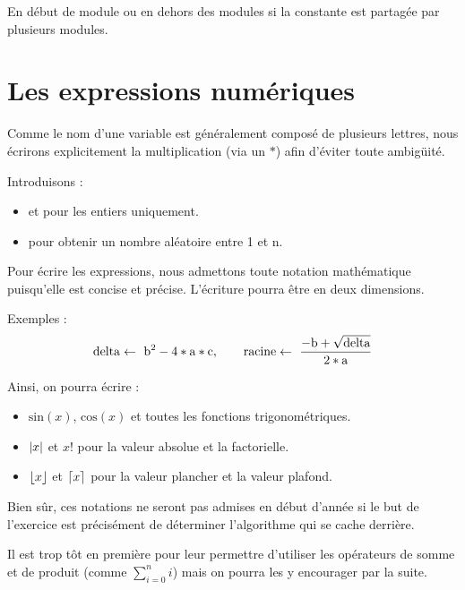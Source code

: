 	En début de module ou en dehors des modules si la constante
	est partagée par plusieurs modules.

\section{Les expressions numériques}

	Comme le nom d'une variable est généralement composé de plusieurs lettres,
	nous écrirons explicitement la multiplication (via un $*$)
	afin d'éviter toute ambigüité.

	Introduisons :

	\begin{itemize}
	\item
		 et  pour les entiers uniquement. 
	\item 
		 pour obtenir un nombre aléatoire entre 1 et n.
	\end{itemize}

	Pour écrire les expressions,
	nous admettons toute notation mathématique
	puisqu'elle est concise et précise.
	L'écriture pourra être en deux dimensions.
	
	Exemples : 
	\begin{equation*}
		\mathrm{delta} \gets\  \mathrm{b}^{2} - 4 * \mathrm{a} * \mathrm{c}
		,\qquad
		\mathrm{racine} \gets\  \frac{-\mathrm{b} + \sqrt{\mathrm{delta}}}{2*\mathrm{a}}
	\end{equation*}
	
	Ainsi, on pourra écrire :

	\DeclarePairedDelimiter\abs{\lvert}{\rvert}
	\DeclarePairedDelimiter\ceil{\lceil}{\rceil}
	\DeclarePairedDelimiter\floor{\lfloor}{\rfloor}
	
	\begin{itemize}
	\item 
		$\mathrm{sin}(x)$, $\mathrm{cos}(x)$ et toutes les fonctions trigonométriques.
	\item
		$\abs{x}$ et $x!$ pour la valeur absolue et la factorielle. 
	\item
		$\floor{x}$ et $\ceil{x}$ pour la valeur plancher et la valeur plafond. 
	\end{itemize}
	
	Bien sûr, ces notations ne seront pas admises
	en début d'année si le but de l'exercice
	est précisément de déterminer l'algorithme qui se cache derrière.
	
	\begin{Note}
	Il est trop tôt en première pour leur permettre
	d'utiliser les opérateurs de somme et de produit
	(comme $\sum_{i=0}^{n}i$)
	mais on pourra les y encourager par la suite.
	\end{Note}
	
